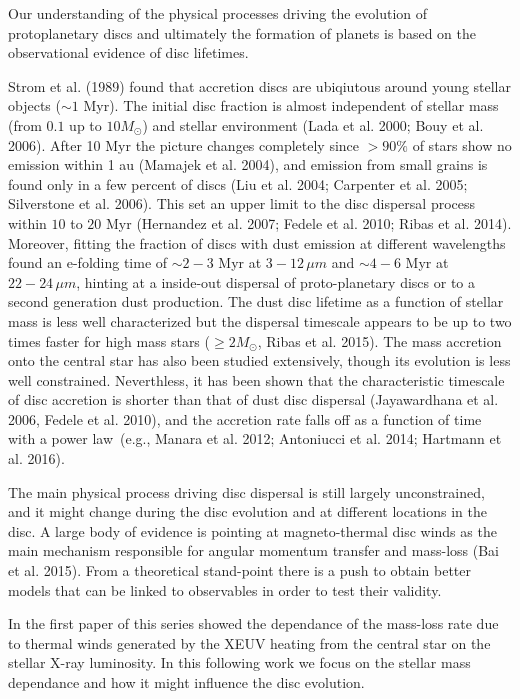 \documentclass{aa}
\begin{document}
Our understanding of the physical processes driving the evolution of protoplanetary discs and ultimately the formation of planets is based on the observational evidence of disc lifetimes.

Strom et al. (1989) found that accretion discs are ubiqiutous around young stellar objects ($\sim 1$ Myr). The initial disc fraction is almost independent of stellar mass (from $0.1$ up to $10 M_\odot$) and stellar environment (Lada et al. 2000; Bouy et al. 2006).
After 10 Myr the picture changes completely since $> 90\%$ of stars show no emission within 1 au (Mamajek et al. 2004), and emission from small grains is found only in a few percent of discs (Liu et al. 2004; Carpenter et al. 2005; Silverstone et al. 2006).
This set an upper limit to the disc dispersal process within $10$ to $20$ Myr (Hernandez et al. 2007; Fedele et al. 2010; Ribas et al. 2014). Moreover, fitting the fraction of discs with dust emission at different wavelengths  found an e-folding time of $\sim2-3$ Myr at $3-12\, \mu m$ and $\sim4-6$ Myr at $22-24\, \mu m$, hinting at a inside-out dispersal of proto-planetary discs or to a second generation dust production.
The dust disc lifetime as a function of stellar mass is less well characterized but the dispersal timescale appears to be up to two times faster for high mass stars ($\geq 2 M_\odot$, Ribas et al. 2015).
The mass accretion onto the central star has also been studied extensively, though its evolution is less well constrained. Neverthless, it has been shown that the characteristic timescale of disc accretion is shorter than that of dust disc dispersal (Jayawardhana et al. 2006, Fedele et al. 2010), and the accretion rate falls off as a function of time with a power law (e.g., Manara et al. 2012; Antoniucci et al. 2014; Hartmann et al. 2016).

The main physical process driving disc dispersal is still largely unconstrained, and it might change during the disc evolution and at different locations in the disc. A large body of evidence is pointing at magneto-thermal disc winds as the main mechanism responsible for angular momentum transfer and mass-loss (Bai et al. 2015). From a theoretical stand-point there is a push to obtain better models that can be linked to observables in order to test their validity.

In the first paper of this series  showed the dependance of the mass-loss rate due to thermal winds generated by the XEUV heating from the central star on the stellar X-ray luminosity. In this following work we focus on the stellar mass dependance and how it might influence the disc evolution.
\end{document}
